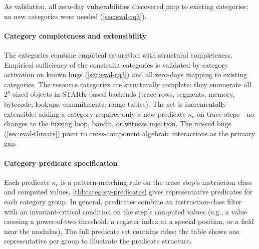 As validation, all  zero-day vulnerabilities \tool discovered map to existing categories; no new categories were needed (\autoref{sec:eval-rq3}).

\paragraph{Category completeness and extensibility}
The  categories combine empirical saturation with structural completeness. Empirical sufficiency of the  constraint categories is validated by  category activation on known bugs (\autoref{sec:eval-rq3}) and all  zero-days mapping to existing categories. The  resource categories are structurally complete: they enumerate all $2^n$-sized objects in STARK-based backends (trace rows, segments, memory, bytecode, lookups, commitments, range tables). The set is incrementally extensible: adding a category requires only a new predicate $\kappa_c$ on trace steps---no changes to the fuzzing loop, bandit, or witness injection. The  missed bugs (\autoref{sec:eval-threats}) point to cross-component algebraic interactions as the primary gap.

\paragraph{Category predicate specification}
Each predicate $\kappa_c$ is a pattern-matching rule on the trace step's instruction class and computed values. \autoref{tbl:category-predicates} gives representative predicates for each category group. In general, predicates combine an instruction-class filter with an invariant-critical condition on the step's computed values (e.g., a value crossing a power-of-two threshold, a register index at a special position, or a field near the modulus). The full predicate set contains  rules; the table shows one representative per group to illustrate the predicate structure.

